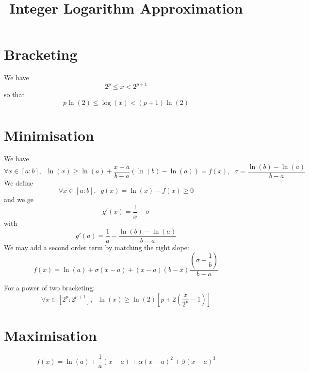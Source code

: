 \documentclass[aps]{revtex4}
\begin{document}
\title{Integer Logarithm Approximation}

\section{Bracketing}

We have 
\begin{equation}
	2^p \leq x < 2^{p+1}
\end{equation}
so that
\begin{equation}
	p\ln(2) \leq \log(x) < (p+1) \ln(2)
\end{equation}

\section{Minimisation}
We have
\begin{equation}
\forall x \in [a:b], \;\; \ln(x) \geq \ln(a) + \dfrac{x-a}{b-a} \left( \ln(b) - \ln(a) \right) = f(x), \;\; \sigma =  \dfrac{\ln(b) - \ln(a)}{b-a}
\end{equation}
We define
\begin{equation}
\forall x \in [a:b], \;\; g(x) = \ln(x) - f(x) \geq 0
\end{equation}
and we ge
\begin{equation}
	g'(x) = \dfrac{1}{x}-\sigma
\end{equation}
with
\begin{equation}
	g'(a) = \dfrac{1}{a} - \dfrac{\ln(b) - \ln(a)}{b-a}
\end{equation}
We may add a second order term by matching the right slope:
\begin{equation}
	f(x) = \ln(a) + \sigma (x-a) + (x-a) (b-x) \dfrac{\left(\sigma - \dfrac{1}{b}\right)}{b-a}
\end{equation}

For a power of two bracketing:
\begin{equation}
\forall x \in [2^p:2^{p+1}],  \;\; \ln(x) \geq \ln(2) \left[ p + 2\left( \dfrac{x}{2^p}-1 \right) \right]
\end{equation}

\section{Maximisation}

\begin{equation}
	f(x) = \ln(a) + \dfrac{1}{a}  (x-a) + \alpha (x-a)^2 + \beta (x-a)^3
\end{equation}
\end{document}
